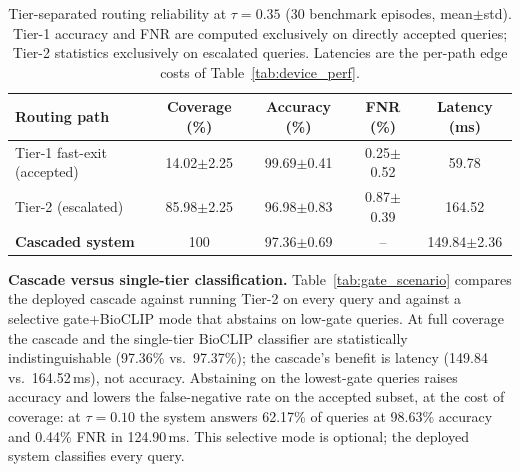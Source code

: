 \documentclass[preprint,12pt]{elsarticle}
\begin{document}
\begin{table}[htbp]
\centering
\caption{Tier-separated routing reliability at $\tau=0.35$ (30 benchmark episodes, mean$\pm$std). Tier-1 accuracy and FNR are computed exclusively on directly accepted queries; Tier-2 statistics exclusively on escalated queries. Latencies are the per-path edge costs of Table~\ref{tab:device_perf}.}
\label{tab:tier_routing}
\small
\begin{tabularx}{\textwidth}{lcccc}
\toprule
\textbf{Routing path} & \textbf{Coverage (\%)} & \textbf{Accuracy (\%)} & \textbf{FNR (\%)} & \textbf{Latency (ms)} \\
\midrule
Tier-1 fast-exit (accepted) & 14.02$\pm$2.25 & 99.69$\pm$0.41 & 0.25$\pm$0.52 & 59.78 \\
Tier-2 (escalated) & 85.98$\pm$2.25 & 96.98$\pm$0.83 & 0.87$\pm$0.39 & 164.52 \\
\midrule
\textbf{Cascaded system} & 100 & 97.36$\pm$0.69 & -- & 149.84$\pm$2.36 \\
\bottomrule
\end{tabularx}
\end{table}

\textbf{Cascade versus single-tier classification.} Table~\ref{tab:gate_scenario} compares the deployed cascade against running Tier-2 on every query and against a selective gate+BioCLIP mode that abstains on low-gate queries. At full coverage the cascade and the single-tier BioCLIP classifier are statistically indistinguishable (97.36\% vs.\ 97.37\%); the cascade's benefit is latency (149.84 vs.\ 164.52\,ms), not accuracy. Abstaining on the lowest-gate queries raises accuracy and lowers the false-negative rate on the accepted subset, at the cost of coverage: at $\tau=0.10$ the system answers 62.17\% of queries at 98.63\% accuracy and 0.44\% FNR in 124.90\,ms. This selective mode is optional; the deployed system classifies every query.
\end{document}
